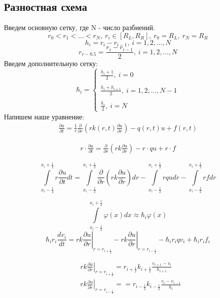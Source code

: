 \subsection{Разностная схема}
Введем основную сетку, где N - число разбиений.
\[ 
  r_0 < r_1 < \dots < r_N,\ r_i \in [R_L, R_R],\ r_0 = R_L,\ r_N = R_R
\]
\[
  h_i =r_i - r_{i-1},\ i=1,2, \dots, N
\]
\[
  r_{r-0.5} = \frac{r_i - r_{i-1}}{2},\ i=1,2, \dots, N
\]
Введем дополнительную сетку:
\[
  \hbar_i = \begin{cases}
    \frac{h_i + 1}{2},\ i = 0 \\ \\
    \frac{h_i + h_{i+1}}{2},\ i = 1, 2, \dots, N-1 \\ \\
    \frac{h_i}{2},\ i = N
  \end{cases}
\]
Напишем наше уравнение:
\begin{align*}
  \frac{\partial u}{\partial t} = \frac{1}{r} \frac{\partial}{\partial r}
  \left ( rk(r, t)\frac{\partial u}{\partial r} \right ) - q(r, t)u + f(r,t)
\end{align*}

\begin{align*}
  r \cdot \frac{\partial u}{\partial t} = \frac{\partial}{\partial r}
  \left ( rk\frac{\partial u}{\partial r} \right ) - r \cdot qu + r \cdot f
\end{align*}

\[
  \int\limits^{x_i+\frac{1}{2}}_{x_i-\frac{1}{2}} r \frac{\partial u}{\partial t} dt =
  \int\limits^{x_i+\frac{1}{2}}_{x_i-\frac{1}{2}} \frac{\partial}{\partial r} \left ( rk\frac{\partial u}{\partial r} \right ) dr
  - \int\limits^{x_i+\frac{1}{2}}_{x_i-\frac{1}{2}} rqu dr - \int\limits^{x_i+\frac{1}{2}}_{x_i-\frac{1}{2}} rf dr
\]

\[
  \int\limits^{x_i+\frac{1}{2}}_{x_i-\frac{1}{2}} \varphi(x)dx \approx \hbar_i \varphi(x)
\]
\[
  \hbar_i r_i \frac{d v_i}{dt} = \left . rk \frac{\partial u}{\partial r} \right \vert_{r=r_{i+\frac{1}{2}}}
  - \left . rk \frac{\partial u}{\partial r} \right \vert_{r=r_{i-\frac{1}{2}}} -\hbar_i r_i q v_i + \hbar_i r_i f_i
\]

\begin{align*}
  &\left . rk \frac{\partial u}{\partial r} \right \vert_{r=r_{i+\frac{1}{2}}} = r_{i + \frac{1}{2}} k_{i + \frac{1}{2}} \frac{v_{i+1}-v_i}{h_{i + 1}} \\
  &\left . rk \frac{\partial u}{\partial r} \right \vert_{r=r_{i-\frac{1}{2}}} = = r_{i - \frac{1}{2}} k_{i - \frac{1}{2}} \frac{v_{i}-v_{i-1}}{h_{i}}
\end{align*}

